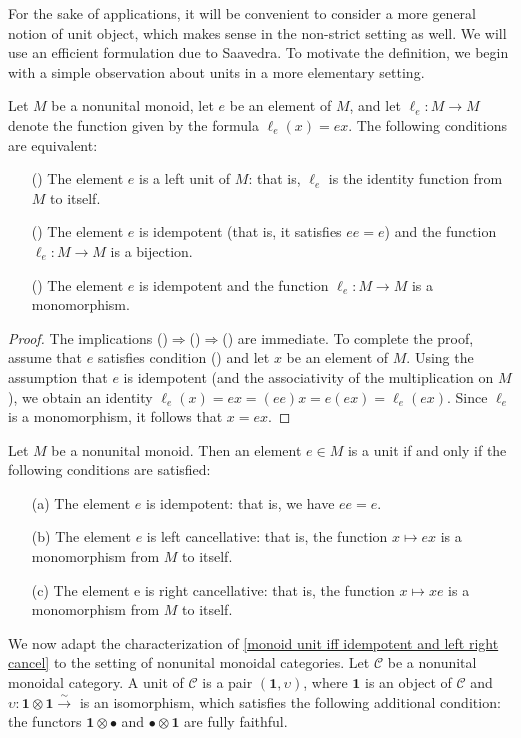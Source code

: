 For the sake of applications, it will be convenient to consider a more general notion of unit object, which makes sense in the non-strict setting as well. We will use an efficient formulation due to Saavedra. To motivate the definition, we begin with a simple observation about units in a more elementary setting.
\begin{proposition}\label{monoid left unit iff ell_e}
Let $M$ be a nonunital monoid, let $e$ be an element of $M$, and let $\ell_e:M\to M$ denote the function given by the formula $\ell_e(x)=ex$. The following conditions are equivalent:
\begin{itemize}
\item[(\rmnum{1})] The element $e$ is a left unit of $M$: that is, $\ell_e$ is the identity function from $M$ to itself.
\item[(\rmnum{2})] The element $e$ is idempotent (that is, it satisfies $ee=e$) and the function $\ell_e:M\to M$ is a bijection.
\item[(\rmnum{3})] The element $e$ is idempotent and the function $\ell_e:M\to M$ is a monomorphism.
\end{itemize}
\end{proposition}
\begin{proof}
The implications ()$\Rightarrow$()$\Rightarrow$() are immediate. To complete the proof, assume that $e$ satisfies condition () and let $x$ be an element of $M$. Using the assumption that $e$ is idempotent (and the associativity of the multiplication on $M$), we obtain an identity $\ell_e(x)=ex=(ee)x=e(ex)=\ell_e(ex)$. Since $\ell_e$ is a monomorphism, it follows that $x=ex$.
\end{proof}
\begin{corollary}\label{monoid unit iff idempotent and left right cancel}
Let $M$ be a nonunital monoid. Then an element $e\in M$ is a unit if and only if the following conditions are satisfied:
\begin{itemize}
\item[(a)] The element $e$ is idempotent: that is, we have $ee=e$.
\item[(b)] The element $e$ is left cancellative: that is, the function $x\mapsto ex$ is a monomorphism from $M$ to itself.
\item[(c)] The element e is right cancellative: that is, the function $x\mapsto xe$ is a monomorphism from $M$ to itself. 
\end{itemize}
\end{corollary}
We now adapt the characterization of \cref{monoid unit iff idempotent and left right cancel} to the setting of nonunital monoidal categories. Let $\mathcal{C}$ be a nonunital monoidal category. A unit of $\mathcal{C}$ is a pair $(\mathbf{1},\upsilon)$, where $\mathbf{1}$ is an object of $\mathcal{C}$ and $\upsilon:\mathbf{1}\otimes\mathbf{1}\stackrel{\sim}{\to}$ is an isomorphism, which satisfies the following additional condition: the functors $\mathbf{1}\otimes\bullet$ and $\bullet\otimes\mathbf{1}$ are fully faithful.
